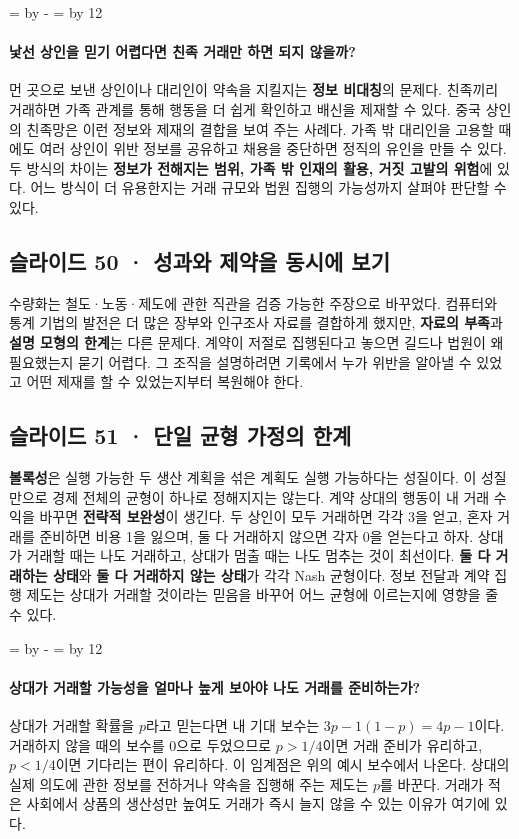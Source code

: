 \documentclass[10pt,a4paper]{article}
\newcommand{\ReserveQuestionSpace}{%
  \par\begingroup
  \dimen0=\pagegoal \advance\dimen0 by -\pagetotal
  \dimen2=\baselineskip \multiply\dimen2 by 12
  \ifdim\dimen0<\dimen2 \newpage\fi
  \endgroup}
\begin{document}
\ReserveQuestionSpace
\paragraph{낯선 상인을 믿기 어렵다면 친족 거래만 하면 되지 않을까?}

먼 곳으로 보낸 상인이나 대리인이 약속을 지킬지는 \textbf{정보 비대칭}의 문제다. 친족끼리 거래하면 가족 관계를 통해 행동을 더 쉽게 확인하고 배신을 제재할 수 있다. 중국 상인의 친족망은 이런 정보와 제재의 결합을 보여 주는 사례다. 가족 밖 대리인을 고용할 때에도 여러 상인이 위반 정보를 공유하고 채용을 중단하면 정직의 유인을 만들 수 있다. 두 방식의 차이는 \textbf{정보가 전해지는 범위, 가족 밖 인재의 활용, 거짓 고발의 위험}에 있다. 어느 방식이 더 유용한지는 거래 규모와 법원 집행의 가능성까지 살펴야 판단할 수 있다.\par

\subsection{슬라이드 50 · 성과와 제약을 동시에 보기}
수량화는 철도·노동·제도에 관한 직관을 검증 가능한 주장으로 바꾸었다. 컴퓨터와 통계 기법의 발전은 더 많은 장부와 인구조사 자료를 결합하게 했지만, \textbf{자료의 부족}과 \textbf{설명 모형의 한계}는 다른 문제다. 계약이 저절로 집행된다고 놓으면 길드나 법원이 왜 필요했는지 묻기 어렵다. 그 조직을 설명하려면 기록에서 누가 위반을 알아낼 수 있었고 어떤 제재를 할 수 있었는지부터 복원해야 한다.\par

\subsection{슬라이드 51 · 단일 균형 가정의 한계}
\textbf{볼록성}은 실행 가능한 두 생산 계획을 섞은 계획도 실행 가능하다는 성질이다. 이 성질만으로 경제 전체의 균형이 하나로 정해지지는 않는다. 계약 상대의 행동이 내 거래 수익을 바꾸면 \textbf{전략적 보완성}이 생긴다. 두 상인이 모두 거래하면 각각 3을 얻고, 혼자 거래를 준비하면 비용 1을 잃으며, 둘 다 거래하지 않으면 각자 0을 얻는다고 하자. 상대가 거래할 때는 나도 거래하고, 상대가 멈출 때는 나도 멈추는 것이 최선이다. \textbf{둘 다 거래하는 상태}와 \textbf{둘 다 거래하지 않는 상태}가 각각 Nash 균형이다. 정보 전달과 계약 집행 제도는 상대가 거래할 것이라는 믿음을 바꾸어 어느 균형에 이르는지에 영향을 줄 수 있다.\par

\ReserveQuestionSpace
\paragraph{상대가 거래할 가능성을 얼마나 높게 보아야 나도 거래를 준비하는가?}
상대가 거래할 확률을 $p$라고 믿는다면 내 기대 보수는 $3p-1(1-p)=4p-1$이다. 거래하지 않을 때의 보수를 0으로 두었으므로 $p>1/4$이면 거래 준비가 유리하고, $p<1/4$이면 기다리는 편이 유리하다. 이 임계점은 위의 예시 보수에서 나온다. 상대의 실제 의도에 관한 정보를 전하거나 약속을 집행해 주는 제도는 $p$를 바꾼다. 거래가 적은 사회에서 상품의 생산성만 높여도 거래가 즉시 늘지 않을 수 있는 이유가 여기에 있다.\par
\end{document}
